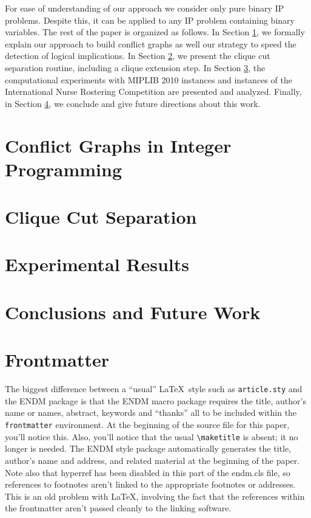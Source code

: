\documentclass{endm}
\begin{document}
For ease of understanding of our approach we consider only pure binary IP problems. Despite this, it can be applied to any IP problem containing binary variables. The rest of the paper is organized as follows. In Section \ref{graph}, we formally explain our approach to build conflict graphs as well our strategy to speed the detection of logical implications. In Section \ref{cut}, we present the clique cut separation routine, including a clique extension step. In Section \ref{experiments}, the computational experiments with MIPLIB 2010 instances \cite{miplib} and instances of the International Nurse Rostering Competition \cite{haspeslagh} are presented and analyzed. Finally, in Section \ref{conclusions}, we conclude and give future directions about this work.

\section{Conflict Graphs in Integer Programming}\label{graph}
\section{Clique Cut Separation}\label{cut}
\section{Experimental Results}\label{experiments}
\section{Conclusions and Future Work}\label{conclusions}

\section{Frontmatter}

The biggest difference between a ``usual'' \LaTeX\ style such as
\texttt{article.sty} and the ENDM package is that the ENDM macro
package requires the title, author's name or names, abstract, keywords
and ``thanks'' all to be included within the \texttt{frontmatter}
environment. At the beginning of the source file for this paper, you'll
notice this. Also, you'll notice that the usual \verb+\maketitle+ is
absent; it no longer is needed. The ENDM style package automatically
generates the title, author's name and address, and related material at
the beginning of the paper. Note also that hyperref has been disabled in
this part of the endm.cls file, so references to footnotes aren't linked
to the appropriate footnotes or addresses. This is an old problem with
\LaTeX, involving the fact that the references within the frontmatter
aren't passed cleanly to the linking software.
\end{document}
